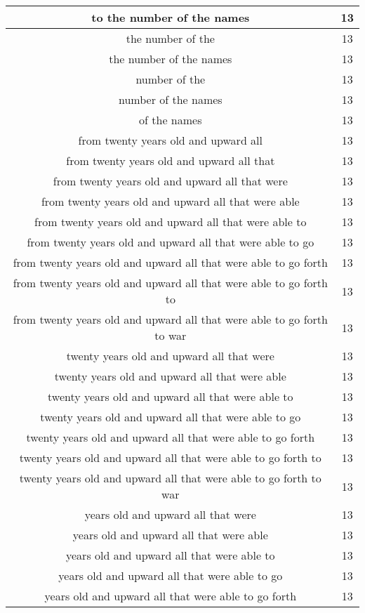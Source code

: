 \begin{center}
\begin{longtable}{|c|c|}
to the number of the names & 13\\ \hline 
the number of the & 13\\ \hline 
the number of the names & 13\\ \hline 
number of the & 13\\ \hline 
number of the names & 13\\ \hline 
of the names & 13\\ \hline 
from twenty years old and upward all & 13\\ \hline 
from twenty years old and upward all that & 13\\ \hline 
from twenty years old and upward all that were & 13\\ \hline 
from twenty years old and upward all that were able & 13\\ \hline 
from twenty years old and upward all that were able to & 13\\ \hline 
from twenty years old and upward all that were able to go & 13\\ \hline 
from twenty years old and upward all that were able to go forth & 13\\ \hline 
from twenty years old and upward all that were able to go forth to & 13\\ \hline 
from twenty years old and upward all that were able to go forth to war & 13\\ \hline 
twenty years old and upward all that were & 13\\ \hline 
twenty years old and upward all that were able & 13\\ \hline 
twenty years old and upward all that were able to & 13\\ \hline 
twenty years old and upward all that were able to go & 13\\ \hline 
twenty years old and upward all that were able to go forth & 13\\ \hline 
twenty years old and upward all that were able to go forth to & 13\\ \hline 
twenty years old and upward all that were able to go forth to war & 13\\ \hline 
years old and upward all that were & 13\\ \hline 
years old and upward all that were able & 13\\ \hline 
years old and upward all that were able to & 13\\ \hline 
years old and upward all that were able to go & 13\\ \hline 
years old and upward all that were able to go forth & 13\\ \hline 

\end{longtable}
\end{center}
